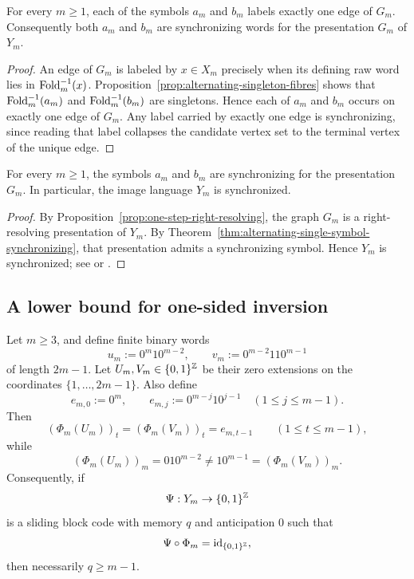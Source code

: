 \begin{theorem}
\label{thm:alternating-single-symbol-synchronizing}
For every $m\ge 1$, each of the symbols $a_m$ and $b_m$ labels exactly one edge
of $G_m$.  Consequently both $a_m$ and $b_m$ are synchronizing words for the
presentation $G_m$ of $Y_m$.
\end{theorem}

\begin{proof}
An edge of $G_m$ is labeled by $x\in X_m$ precisely when its defining raw word
lies in $\operatorname{Fold}_m^{-1}(x)$.  Proposition~\ref{prop:alternating-singleton-fibres}
shows that $\operatorname{Fold}_m^{-1}(a_m)$ and $\operatorname{Fold}_m^{-1}(b_m)$ are singletons.  Hence
each of $a_m$ and $b_m$ occurs on exactly one edge of $G_m$.  Any label carried
by exactly one edge is synchronizing, since reading that label collapses the
candidate vertex set to the terminal vertex of the unique edge.
\end{proof}

\begin{corollary}
\label{cor:Y-m-synchronized}
For every $m\ge 1$, the symbols $a_m$ and $b_m$ are synchronizing for the
presentation $G_m$.  In particular, the image language $Y_m$ is synchronized.
\end{corollary}

\begin{proof}
By Proposition~\ref{prop:one-step-right-resolving}, the graph $G_m$ is a
right-resolving presentation of $Y_m$.  By
Theorem~\ref{thm:alternating-single-symbol-synchronizing}, that presentation
admits a synchronizing symbol.  Hence $Y_m$ is synchronized; see
\cite[Ch.~3]{LindMarcus1995} or \cite[Ch.~4]{Kitchens1998SymbolicDynamics}.
\end{proof}

\subsection{A lower bound for one-sided inversion}

\begin{proposition}
\label{prop:one-sided-inverse-memory-lower-bound}
Let $m\ge 3$, and define finite binary words
\[
u_m:=0^m10^{m-2},
\qquad
v_m:=0^{m-2}110^{m-1}
\]
of length $2m-1$.  Let $U_m,V_m\in\{0,1\}^{\mathbb{Z}}$ be their zero extensions on
the coordinates $\{1,\ldots,2m-1\}$.  Also define
\[
e_{m,0}:=0^m,
\qquad
e_{m,j}:=0^{m-j}10^{j-1}
\quad (1\le j\le m-1).
\]
Then
\[
(\Phi_m(U_m))_t=(\Phi_m(V_m))_t=e_{m,t-1}
\qquad (1\le t\le m-1),
\]
while
\[
(\Phi_m(U_m))_m=010^{m-2}\neq 10^{m-1}=(\Phi_m(V_m))_m.
\]
Consequently, if
\[
\Psi:Y_m\to\{0,1\}^{\mathbb{Z}}
\]
is a sliding block code with memory $q$ and anticipation $0$ such that
\[
\Psi\circ\Phi_m=\mathrm{id}_{\{0,1\}^{\mathbb{Z}}},
\]
then necessarily $q\ge m-1$.
\end{proposition}

